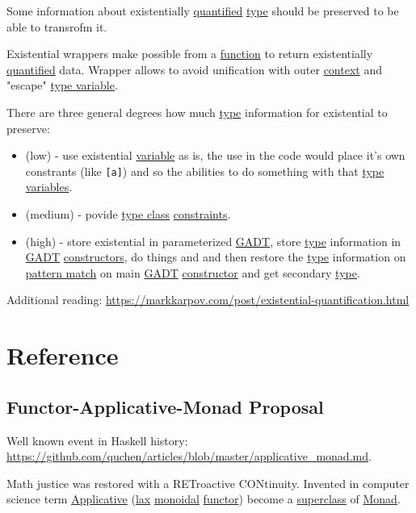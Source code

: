 \documentclass[a4paper,14pt,oneside]{book}
\begin{document}
Some information about existentially \hyperref[org538d39a]{quantified} \hyperref[org84bd6a1]{type} should be preserved to be able to transrofm it.

Existential wrappers make possible from a \hyperref[orgc19b425]{function} to return existentially \hyperref[org538d39a]{quantified} data. Wrapper allows to avoid unification with outer \hyperref[orgcbee66e]{context} and "escape" \hyperref[org379ef1b]{type variable}.

There are three general degrees how much \hyperref[org84bd6a1]{type} information for existential to preserve:

\begin{itemize}
\item (low) - use existential \hyperref[org4b258b9]{variable} as is, the use in the code would place it's own constrants (like \texttt{[a]}) and so the abilities to do something with that \hyperref[org84bd6a1]{type} \hyperref[org201495c]{variables}.
\item (medium) - povide \hyperref[orgba460a7]{type class} \hyperref[org3b9e7d2]{constraints}.
\item (high) - store existential in parameterized \hyperref[orgb94ae8f]{GADT}, store \hyperref[org84bd6a1]{type} information in \hyperref[orgb94ae8f]{GADT} \hyperref[orgca358f3]{constructors}, do things and and then restore the \hyperref[org84bd6a1]{type} information on \hyperref[org50a5ed6]{pattern match} on main \hyperref[orgb94ae8f]{GADT} \hyperref[org331b647]{constructor} and get secondary \hyperref[org84bd6a1]{type}.
\end{itemize}

Additional reading: \url{https://markkarpov.com/post/existential-quantification.html}

\part{Reference}
\label{sec:org8dc5cfb}

\chapter{\label{org5557601}Functor-Applicative-Monad Proposal}
\label{sec:org7fd5b93}
Well known event in Haskell history: \url{https://github.com/quchen/articles/blob/master/applicative\_monad.md}.

Math justice was restored with a RETroactive CONtinuity. Invented in computer science term \hyperref[orgd3fcfef]{Applicative} (\hyperref[org180ccc7]{lax} \hyperref[orgeb44057]{monoidal} \hyperref[org1d3129c]{functor}) become a \hyperref[org484135b]{superclass} of \hyperref[org960326e]{Monad}.
\end{document}
